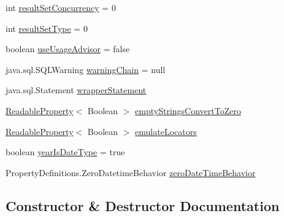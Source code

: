 \begin{DoxyCompactItemize}
\item 
int \mbox{\hyperlink{classcom_1_1mysql_1_1cj_1_1jdbc_1_1result_1_1_result_set_impl_a66babb9ad9caeed50805a7903b02d39d}{result\+Set\+Concurrency}} = 0
\item 
int \mbox{\hyperlink{classcom_1_1mysql_1_1cj_1_1jdbc_1_1result_1_1_result_set_impl_af3d3012aaec246d4e0bdae8d3b4d0dc4}{result\+Set\+Type}} = 0
\item 
boolean \mbox{\hyperlink{classcom_1_1mysql_1_1cj_1_1jdbc_1_1result_1_1_result_set_impl_a82d5de7f352a7095f5bde7d7e73661b3}{use\+Usage\+Advisor}} = false
\item 
java.\+sql.\+S\+Q\+L\+Warning \mbox{\hyperlink{classcom_1_1mysql_1_1cj_1_1jdbc_1_1result_1_1_result_set_impl_a5575179b551e7273df80ac0ee61870e1}{warning\+Chain}} = null
\item 
java.\+sql.\+Statement \mbox{\hyperlink{classcom_1_1mysql_1_1cj_1_1jdbc_1_1result_1_1_result_set_impl_a0f31d2bda94351b8afc869362a5b96d5}{wrapper\+Statement}}
\item 
\mbox{\hyperlink{interfacecom_1_1mysql_1_1cj_1_1conf_1_1_readable_property}{Readable\+Property}}$<$ Boolean $>$ \mbox{\hyperlink{classcom_1_1mysql_1_1cj_1_1jdbc_1_1result_1_1_result_set_impl_a32fa2484e618e3ab4c2d406eb7f2e0d5}{empty\+Strings\+Convert\+To\+Zero}}
\item 
\mbox{\hyperlink{interfacecom_1_1mysql_1_1cj_1_1conf_1_1_readable_property}{Readable\+Property}}$<$ Boolean $>$ \mbox{\hyperlink{classcom_1_1mysql_1_1cj_1_1jdbc_1_1result_1_1_result_set_impl_aa1b568155e4d8864ea8a793f70fdbdb1}{emulate\+Locators}}
\item 
boolean \mbox{\hyperlink{classcom_1_1mysql_1_1cj_1_1jdbc_1_1result_1_1_result_set_impl_a33a5646aa260799722a473c19278549e}{year\+Is\+Date\+Type}} = true
\item 
Property\+Definitions.\+Zero\+Datetime\+Behavior \mbox{\hyperlink{classcom_1_1mysql_1_1cj_1_1jdbc_1_1result_1_1_result_set_impl_ac5bad4f20493f69caf9781542f282fdb}{zero\+Date\+Time\+Behavior}}
\end{DoxyCompactItemize}


\subsection{Constructor \& Destructor Documentation}
\mbox{\label{classcom_1_1mysql_1_1cj_1_1jdbc_1_1result_1_1_result_set_impl_a914a5dc6a7f92d9cb726895992aaeb0e}} 
